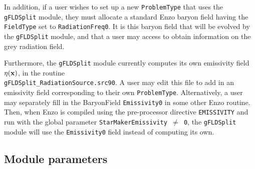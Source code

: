 \documentclass[letterpaper,10pt]{article}
\renewcommand{\(}{\left(}
\renewcommand{\)}{\right)}
\newcommand{\xvec}{{\bf x}}
\begin{document}
In addition, if a user wishes to set up a new {\tt ProblemType} that
uses the {\tt gFLDSplit} module, they must allocate a standard Enzo
baryon field having the {\tt FieldType} set to {\tt RadiationFreq0}.
It is this baryon field that will be evolved by the {\tt gFLDSplit}
module, and that a user may access to obtain information on the
grey radiation field. 

Furthermore, the {\tt gFLDSplit} module currently computes its own
emissivity field $\eta(\xvec)$, in the routine \\
{\tt gFLDSplit\_RadiationSource.src90}.  A user may edit this file
to add in an emissivity field corresponding to their own 
{\tt ProblemType}.  Alternatively, a user may separately fill in the
BaryonField {\tt Emissivity0} in some other Enzo routine.  Then, when
Enzo is compiled using the pre-processor directive {\tt EMISSIVITY}
and run with the global parameter {\tt StarMakerEmissivity $\ne$ 0},
the {\tt gFLDSplit} module will use the {\tt Emissivity0} field
instead of computing its own. 



\subsection{Module parameters}
\end{document}

